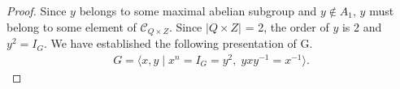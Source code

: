 \begin{proof}










Since $y$ belongs to some maximal abelian subgroup and $y \not \in A_1$, $y$ must belong to some element of $\mathcal{C}_{Q \times Z}$. Since $|Q \times Z|$ = 2, the order of $y$ is 2 and $y^2 = I_G$. We have established the following presentation of G.
\begin{align*} G = \langle x, y \; | \; x^n = I_G = y^2, \; y x y^{-1} = x^{-1} \rangle.
\end{align*}


\end{proof}
